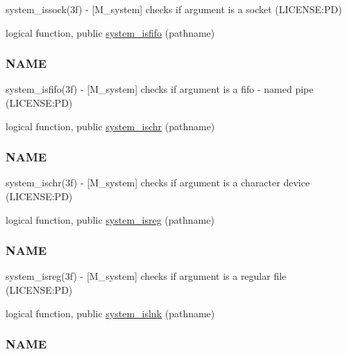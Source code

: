 \begin{DoxyCompactItemize}
\begin{DoxyCompactList}
system\+\_\+issock(3f) -\/ \mbox{[}M\+\_\+system\mbox{]} checks if argument is a socket (L\+I\+C\+E\+N\+SE\+:PD) \end{DoxyCompactList}\item 
logical function, public \mbox{\hyperlink{namespacem__system_acbcaa0c5075ca103815f441ee410e1a3}{system\+\_\+isfifo}} (pathname)
\begin{DoxyCompactList}\small\item\em \subsubsection*{N\+A\+ME}

system\+\_\+isfifo(3f) -\/ \mbox{[}M\+\_\+system\mbox{]} checks if argument is a fifo -\/ named pipe (L\+I\+C\+E\+N\+SE\+:PD) \end{DoxyCompactList}\item 
logical function, public \mbox{\hyperlink{namespacem__system_a12a948fa4aacda084a538ae3a5ae3cc6}{system\+\_\+ischr}} (pathname)
\begin{DoxyCompactList}\small\item\em \subsubsection*{N\+A\+ME}

system\+\_\+ischr(3f) -\/ \mbox{[}M\+\_\+system\mbox{]} checks if argument is a character device (L\+I\+C\+E\+N\+SE\+:PD) \end{DoxyCompactList}\item 
logical function, public \mbox{\hyperlink{namespacem__system_a127bdd84ccd4b52f3f29abbc56af029b}{system\+\_\+isreg}} (pathname)
\begin{DoxyCompactList}\small\item\em \subsubsection*{N\+A\+ME}

system\+\_\+isreg(3f) -\/ \mbox{[}M\+\_\+system\mbox{]} checks if argument is a regular file (L\+I\+C\+E\+N\+SE\+:PD) \end{DoxyCompactList}\item 
logical function, public \mbox{\hyperlink{namespacem__system_ab05694cc3d76a3ecc87e4b4490c4c217}{system\+\_\+islnk}} (pathname)
\begin{DoxyCompactList}\small\item\em \subsubsection*{N\+A\+ME}


\end{DoxyCompactList}
\end{DoxyCompactItemize}

